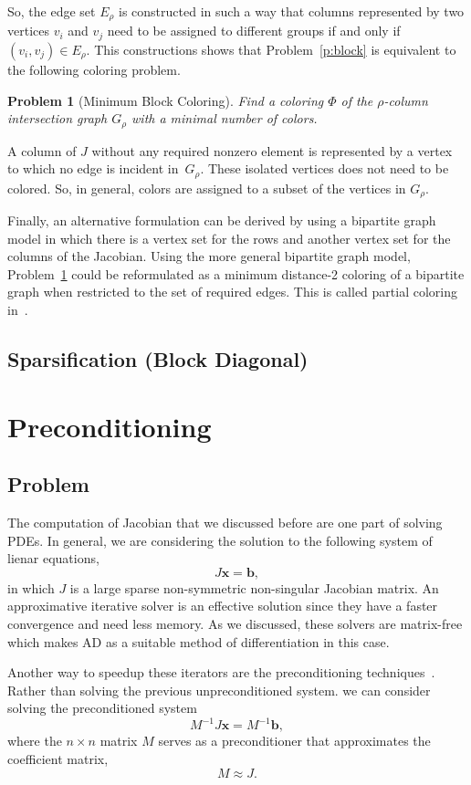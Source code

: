 \documentclass[12pt, oneside]{book}
\newtheorem{problem}{Problem}
\newcommand{\vek}[1]{{\ensuremath{\mathbf #1}}}
\newcommand{\sparsifysymbol}{\ensuremath{\rho}}
\begin{document}
So, the edge set $E_\sparsifysymbol$ is constructed in such a way that columns
represented by two vertices $v_i$ and $v_j$ need to be assigned to different groups if
and only if $(v_i, v_j) \in E_\sparsifysymbol$. This constructions shows that
Problem~\ref{p:block} is equivalent to the following coloring problem.
%
\begin{problem}[Minimum Block Coloring]
\label{p:minblockcol}
%
Find a coloring $\Phi$ of the $\sparsifysymbol$-column intersection graph
$G_\sparsifysymbol$ with a minimal number of colors.
\end{problem}

A column of $J$ without any required nonzero element is represented by a vertex to which
no edge is incident in~$G_\sparsifysymbol$. These isolated vertices does not need to be
colored. So, in general, colors are assigned to a subset of the vertices in
$G_\sparsifysymbol$.

Finally, an alternative formulation can be derived by using a bipartite graph model in
which there is a vertex set for the rows and another vertex set for the columns of the
Jacobian. Using the more general bipartite graph model, Problem~\ref{p:minblockcol} could
be reformulated as a minimum distance-2 coloring of a bipartite graph when restricted to
the set of required edges. This is called partial coloring in~\cite{Gebremedhin05whatcolor}.
\subsection{Sparsification (Block Diagonal)}
\section{Preconditioning}
\label{precond}
\subsection{Problem}
The computation of Jacobian that we discussed before are one part of solving PDEs. 
In general, we are considering the solution to the following system of lienar equations,
$$
J\vek{x} = \vek{b},
$$
in which $J$ is a large sparse non-symmetric non-singular Jacobian matrix. An approximative iterative solver is an
effective solution since they have a faster convergence and need less memory. As we discussed,
these solvers are matrix-free which makes AD as a suitable method of differentiation in this case.

Another way to speedup these iterators are 
the preconditioning techniques~\cite{precond1,precond2}.
Rather than solving the previous unpreconditioned system. 
we can consider solving the preconditioned system
\begin{equation}
\label{e:precond}
M^{-1} J \vek{x}= M^{-1}\vek{b},
\end{equation}
where the $n \times n$ matrix $M$ serves as a preconditioner that approximates
the coefficient matrix,
$$
M \approx J.
$$
\end{document}
